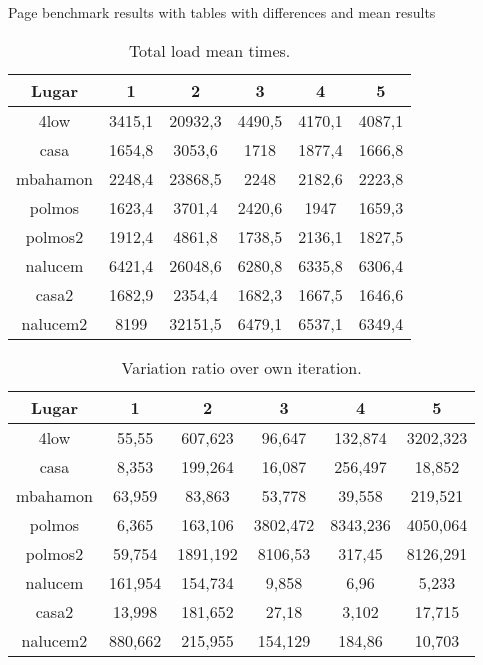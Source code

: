Page benchmark results with tables with differences and mean results


\begin{table}[h]
\caption[Page Benchmark Test: Total load mean times]{Total load mean times. }
\begin{center}
\begin{tabular}{|c||c|c|c|c|c|}
\hline
Lugar & 1 & 2 & 3 & 4 & 5 \\ \hline \hline
4low & 3415,1 & 20932,3 & 4490,5 & 4170,1 & 4087,1 \\ \hline
casa & 1654,8 & 3053,6 & 1718 & 1877,4 & 1666,8 \\ \hline
mbahamon & 2248,4 & 23868,5 & 2248 & 2182,6 & 2223,8 \\ \hline
polmos & 1623,4 & 3701,4 & 2420,6 & 1947 & 1659,3 \\ \hline
polmos2 & 1912,4 & 4861,8 & 1738,5 & 2136,1 & 1827,5 \\ \hline
nalucem & 6421,4 & 26048,6 & 6280,8 & 6335,8 & 6306,4 \\ \hline
casa2 & 1682,9 & 2354,4 & 1682,3 & 1667,5 & 1646,6 \\ \hline
nalucem2 & 8199 & 32151,5 & 6479,1 & 6537,1 & 6349,4 \\ \hline
\end{tabular}
\end{center}
\label{table:totalmeantimes}
\end{table}

\begin{table}[h]
\caption[Page Benchmark Test: Variation ratio over own iteration]{Variation ratio over own iteration.}
\begin{center}
\begin{tabular}{|c||c|c|c|c|c|}
\hline
Lugar & 1 & 2 & 3 & 4 & 5 \\ \hline \hline
4low & 55,55 & 607,623 & 96,647 & 132,874 & 3202,323 \\ \hline
casa & 8,353 & 199,264 & 16,087 & 256,497 & 18,852 \\ \hline
mbahamon & 63,959 & 83,863 & 53,778 & 39,558 & 219,521 \\ \hline
polmos & 6,365 & 163,106 & 3802,472 & 8343,236 & 4050,064 \\ \hline
polmos2 & 59,754 & 1891,192 & 8106,53 & 317,45 & 8126,291 \\ \hline
nalucem & 161,954 & 154,734 & 9,858 & 6,96 & 5,233 \\ \hline
casa2 & 13,998 & 181,652 & 27,18 & 3,102 & 17,715 \\ \hline
nalucem2 & 880,662 & 215,955 & 154,129 & 184,86 & 10,703 \\ \hline
\end{tabular}
\end{center}
\label{table:variationiter}
\end{table}


